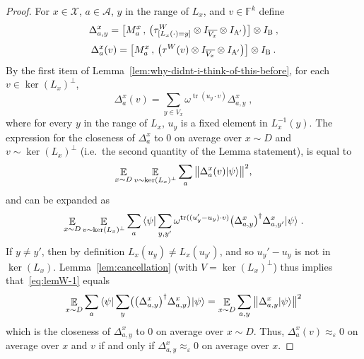 \documentclass[11pt]{article}
\theoremstyle{definition}
\newcommand{\ket}[1]{|#1\rangle}
\newcommand{\bra}[1]{\langle#1|}
\newcommand{\Id}{\ensuremath{I}}
\newcommand{\F}{\ensuremath{\mathbb{F}}}
\newcommand{\eps}{\varepsilon}
\DeclareMathOperator{\tr}{tr}
\newcommand{\E}{\mathop{\mathbb{E}}\displaylimits}
\newcommand{\labelstyle}[1]{\ensuremath{\textsc{#1}}\xspace}
\newcommand{\alice}{\labelstyle{A}}
\newcommand{\bob}{\labelstyle{B}}
\renewcommand{\cal}[1]{\mathcal{#1}}
\begin{document}
\begin{proof}
  For $x\in \cal{X}$, $a\in \cal{A}$, $y$ in the range of $L_x$, and $v\in \F^k$
  define
  \begin{equation*}
    \Delta^x_{a,y} = \big[ M^x_a \,,\, \big(\tau^W_{[L_x(\cdot)=y]} \otimes
    \Id_{\overline{V_x}} \otimes \Id_{\alice'}\big) \big]\otimes \Id_\bob\:,
  \end{equation*}
  \begin{equation*}
    \Delta^x_a(v) = \big[ M^x_a \,,\, \big( \tau^W(v) \otimes
    \Id_{\overline{V_x}} \otimes \Id_{\alice'} \big) \big]  \otimes \Id_\bob\:.
  \end{equation*}
  By the first item of Lemma~\ref{lem:why-didnt-i-think-of-this-before}, for
  each $v \in \ker(L_x)^\perp$,
  \begin{equation*}
    \Delta^x_a(v) = \sum_{y \in V_x} \omega^{\tr(u_y \cdot v)} \Delta^x_{a,y}\;,
  \end{equation*}
	where for every $y$ in the range of $L_x$, $u_y$ is a fixed element in
  $L_x^{-1}(y)$.
  The expression for the closeness of $\Delta^x_a$ to $0$ on average over $x
  \sim D$ and $v \sim \ker(L_x)^\perp$ (i.e.\ the second quantity of the Lemma
  statement), is equal to
  \begin{equation*}
    \E_{x\sim D} \E_{v \sim \ker(L_x)^\perp} \sum_a\, \bigl \| \Delta^x_a (v)
  \ket{\psi}\bigr \|^2,
  \end{equation*}
  and can be expanded as
  \begin{equation}\label{eq:lemW-1}
    \E_{x\sim D} \E_{v \sim \ker(L_x)^\perp} \sum_a\, \bra{\psi} \sum_{y,y'}
    \omega^{\tr ((u_y'-u_y) \cdot v)} \bigl( \Delta^x_{a,y} \bigr)^\dagger
    \Delta^x_{a,y'} \ket{\psi}\;.
  \end{equation}
  If $y \neq y'$, then by definition $L_x(u_y) \neq L_x(u_{y'})$, and so $u_y' -
  u_y$ is not in $\ker(L_x)$.
  Lemma~\ref{lem:cancellation} (with $V = \ker(L_x)^\perp$) thus implies
  that~\eqref{eq:lemW-1} equals
  \begin{equation*}
    \E_{x\sim D} \sum_a\, \bra{\psi} \sum_{y} \bigl( \bigl( \Delta^x_{a,y}
    \bigr)^\dagger \Delta^x_{a,y} \bigr) \ket{\psi} = \E_{x\sim D} \sum_{a, y}
    \, \bigl \|\Delta^x_{a,y} \ket{\psi} \bigr \|^2
  \end{equation*}
  which is the closeness of $\Delta^x_{a,y}$ to $0$ on average over $x \sim D$.
  Thus, $\Delta^x_a(v) \approx_\eps 0$ on average over $x$ and $v$ if and only
  if $\Delta^x_{a,y} \approx_\eps 0$ on average over $x$.
\end{proof}
\end{document}
